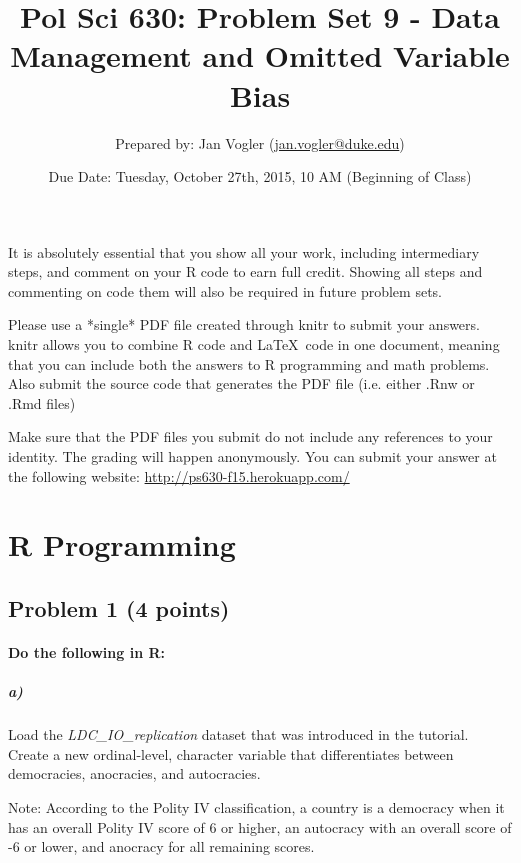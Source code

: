 \documentclass[12pt]{article}
\begin{document}
\title{Pol Sci 630: Problem Set 9 - Data Management and Omitted Variable Bias}

\author{Prepared by: Jan Vogler (\href{mailto:jan.vogler@duke.edu}{jan.vogler@duke.edu})}

\date{Due Date: Tuesday, October 27th, 2015, 10 AM (Beginning of Class)}
 
\maketitle 



It is absolutely essential that you show all your work, including intermediary steps, and comment on your R code to earn full credit. Showing all steps and commenting on code them will also be required in future problem sets.

Please use a *single* PDF file created through knitr to submit your answers. knitr allows you to combine R code and \LaTeX \ code in one document, meaning that you can include both the answers to R programming and math problems. Also submit the source code that generates the PDF file (i.e. either .Rnw or .Rmd files)

Make sure that the PDF files you submit do not include any references to your identity. The grading will happen anonymously. You can submit your answer at the following website: \url{http://ps630-f15.herokuapp.com/}



\section*{R Programming}

\subsection*{Problem 1 (4 points)}

\paragraph{Do the following in R:}

\subparagraph{a)} Load the \textit{LDC\_IO\_replication} dataset that was introduced in the tutorial. Create a new ordinal-level, character variable that differentiates between democracies, anocracies, and autocracies.

Note: According to the Polity IV classification, a country is a democracy when it has an overall Polity IV score of 6 or higher, an autocracy with an overall score of -6 or lower, and anocracy for all remaining scores.
\end{document}
